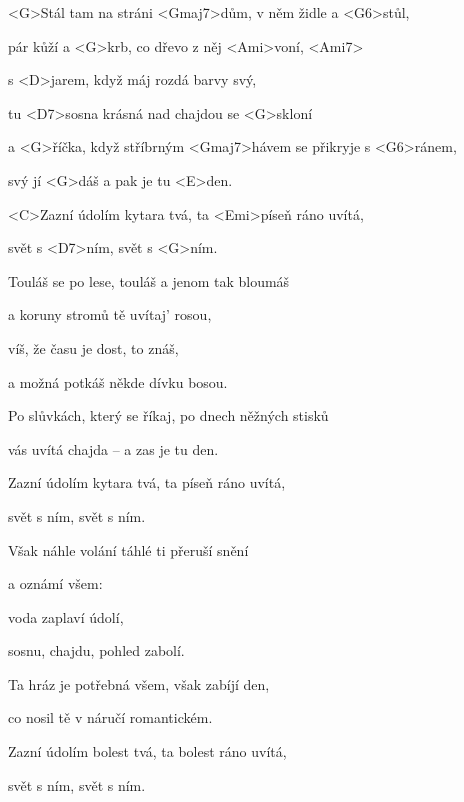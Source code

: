 

\zs
<G>Stál tam na stráni <Gmaj7>dům, v něm židle a <G6>stůl,

pár kůží a <G>krb, co dřevo z něj <Ami>voní, <Ami7>

s <D>jarem, když máj rozdá barvy svý,

tu <D7>sosna krásná nad chajdou se <G>skloní

a <G>říčka, když stříbrným <Gmaj7>hávem se přikryje s <G6>ránem,

svý  jí <G>dáš a pak je tu <E>den.

<C>Zazní údolím kytara tvá, ta <Emi>píseň ráno uvítá,

svět s <D7>ním, svět s <G>ním.
\ks

\zs
Touláš se po lese, touláš a jenom tak bloumáš

a koruny stromů tě uvítaj' rosou,

víš, že času je dost, to znáš,

a možná potkáš někde dívku bosou.

Po slůvkách, který se říkaj, po dnech něžných stisků

vás uvítá chajda -- a zas je tu den.

Zazní údolím kytara tvá, ta píseň ráno uvítá,

svět s ním, svět s ním.
\ks

\zs
Však náhle volání táhlé ti přeruší snění

a oznámí všem: 

voda zaplaví údolí,

sosnu, chajdu, pohled zabolí.

Ta hráz je potřebná všem, však zabíjí den,

co nosil tě v náručí romantickém.

Zazní údolím bolest tvá, ta bolest ráno uvítá,

svět s ním, svět s ním.
\ks

\kp
